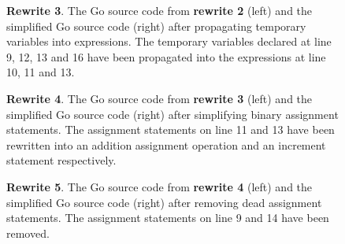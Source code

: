 \begin{figure}[htbp]
	\centering
	\begin{subfigure}[t]{0.45\textwidth}
		
	\end{subfigure}
	\qquad
	\begin{subfigure}[t]{0.45\textwidth}
		
	\end{subfigure}
	\caption{\textbf{Rewrite 3}. The Go source code from \textbf{rewrite 2} (left) and the simplified Go source code (right) after propagating temporary variables into expressions. The temporary variables declared at line 9, 12, 13 and 16 have been propagated into the expressions at line 10, 11 and 13.}
	\label{fig:rewrite_3}
\end{figure}

\begin{figure}[htbp]
	\centering
	\begin{subfigure}[t]{0.45\textwidth}
		
	\end{subfigure}
	\qquad
	\begin{subfigure}[t]{0.45\textwidth}
		
	\end{subfigure}
	\caption{\textbf{Rewrite 4}. The Go source code from \textbf{rewrite 3} (left) and the simplified Go source code (right) after simplifying binary assignment statements. The assignment statements on line 11 and 13 have been rewritten into an addition assignment operation and an increment statement respectively.}
	\label{fig:rewrite_4}
\end{figure}

\begin{figure}[htbp]
	\centering
	\begin{subfigure}[t]{0.45\textwidth}
		
	\end{subfigure}
	\qquad
	\begin{subfigure}[t]{0.45\textwidth}
		
	\end{subfigure}
	\caption{\textbf{Rewrite 5}. The Go source code from \textbf{rewrite 4} (left) and the simplified Go source code (right) after removing dead assignment statements. The assignment statements on line 9 and 14 have been removed.}
	\label{fig:rewrite_5}
\end{figure}

